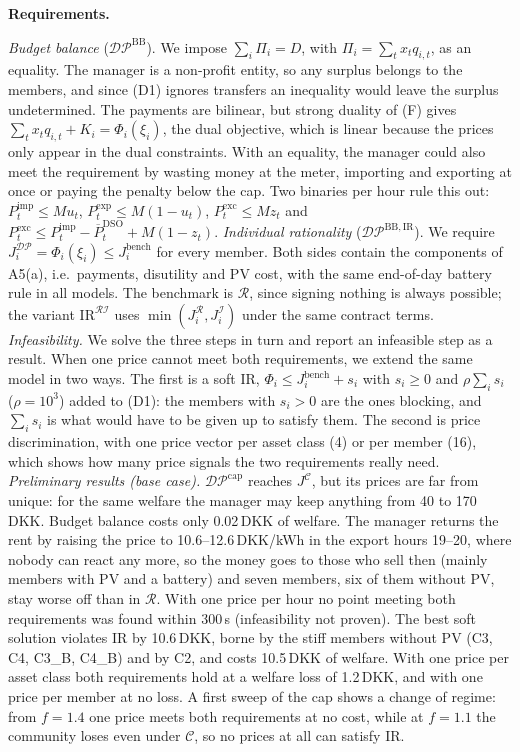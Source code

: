 \documentclass[10pt,a4paper]{article}
\newcommand{\cR}{\mathcal{R}}
\newcommand{\cI}{\mathcal{I}}
\newcommand{\cC}{\mathcal{C}}
\newcommand{\cDP}{\mathcal{DP}}
\newcommand{\Pimp}{P^{\mathrm{imp}}_t}
\newcommand{\Pexp}{P^{\mathrm{exp}}_t}
\newcommand{\Pexc}{P^{\mathrm{exc}}_t}
\newcommand{\Pcap}{\overline P^{\mathrm{DSO}}_t}
\newcommand{\qitem}[2]{\par\smallskip\noindent{\color{dtured}\textbf{#1}}\enspace\textbf{#2}\par\nopagebreak}
\begin{document}
\qitem{C3}{Requirements.}
\begin{answer}
\emph{Budget balance} ($\cDP^{\mathrm{BB}}$). We impose $\sum_i\Pi_i=D$, with $\Pi_i=\sum_tx_tq_{i,t}$, as an equality. The manager is a non-profit entity, so any surplus belongs to the members, and since (D1) ignores transfers an inequality would leave the surplus undetermined. The payments are bilinear, but strong duality of (F) gives $\sum_tx_tq_{i,t}+K_i=\Phi_i(\xi_i)$, the dual objective, which is linear because the prices only appear in the dual constraints. With an equality, the manager could also meet the requirement by wasting money at the meter, importing and exporting at once or paying the penalty below the cap. Two binaries per hour rule this out: $\Pimp\le Mu_t$, $\Pexp\le M(1-u_t)$, $\Pexc\le Mz_t$ and $\Pexc\le\Pimp-\Pcap+M(1-z_t)$.
\emph{Individual rationality} ($\cDP^{\mathrm{BB,IR}}$). We require $J^{\cDP}_i=\Phi_i(\xi_i)\le J^{\mathrm{bench}}_i$ for every member. Both sides contain the components of A5(a), i.e.\ payments, disutility and PV cost, with the same end-of-day battery rule in all models. The benchmark is $\cR$, since signing nothing is always possible; the variant $\mathrm{IR}^{\cR\cI}$ uses $\min(J^{\cR}_i,J^{\cI}_i)$ under the same contract terms.
\emph{Infeasibility.} We solve the three steps in turn and report an infeasible step as a result. When one price cannot meet both requirements, we extend the same model in two ways. The first is a soft IR, $\Phi_i\le J^{\mathrm{bench}}_i+s_i$ with $s_i\ge0$ and $\rho\sum_is_i$ ($\rho=10^3$) added to (D1): the members with $s_i>0$ are the ones blocking, and $\sum_is_i$ is what would have to be given up to satisfy them. The second is price discrimination, with one price vector per asset class (4) or per member (16), which shows how many price signals the two requirements really need.
\emph{Preliminary results (base case).} $\cDP^{\mathrm{cap}}$ reaches $J^{\cC}$, but its prices are far from unique: for the same welfare the manager may keep anything from 40 to 170\,DKK. Budget balance costs only 0.02\,DKK of welfare. The manager returns the rent by raising the price to 10.6--12.6\,DKK/kWh in the export hours 19--20, where nobody can react any more, so the money goes to those who sell then (mainly members with PV and a battery) and seven members, six of them without PV, stay worse off than in $\cR$. With one price per hour no point meeting both requirements was found within 300\,s (infeasibility not proven). The best soft solution violates IR by 10.6\,DKK, borne by the stiff members without PV (C3, C4, C3\_B, C4\_B) and by C2, and costs 10.5\,DKK of welfare. With one price per asset class both requirements hold at a welfare loss of 1.2\,DKK, and with one price per member at no loss. A first sweep of the cap shows a change of regime: from $f=1.4$ one price meets both requirements at no cost, while at $f=1.1$ the community loses even under $\cC$, so no prices at all can satisfy IR.
\end{answer}
\end{document}
